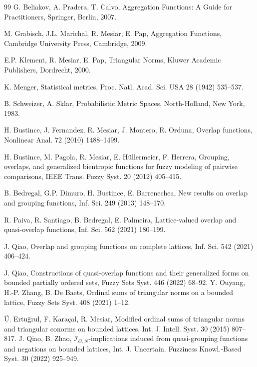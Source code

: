 \documentclass[preprint,12pt]{elsarticle}
\begin{document}
\begin{thebibliography}{99}
G. Beliakov, A. Pradera, T. Calvo, Aggregation Functions: A Guide for Practitioners, Springer, Berlin, 2007.

M. Grabisch, J.L. Marichal, R. Mesiar, E. Pap, Aggregation Functions, Cambridge University Press, Cambridge, 2009.

E.P. Klement, R. Mesiar, E. Pap, Triangular Norms, Kluwer Academic Publishers, Dordrecht, 2000.

K. Menger, Statistical metrics, Proc. Natl. Acad. Sci. USA 28 (1942) 535--537.

B. Schweizer, A. Sklar, Probabilistic Metric Spaces, North-Holland, New York, 1983.

H. Bustince, J. Fernandez, R. Mesiar, J. Montero, R. Orduna, Overlap functions, Nonlinear Anal. 72 (2010) 1488--1499.

H. Bustince, M. Pagola, R. Mesiar, E. Hüllermeier, F. Herrera, Grouping, overlaps, and generalized bientropic functions for fuzzy modeling of pairwise comparisons, IEEE Trans. Fuzzy Syst. 20 (2012) 405--415.

B. Bedregal, G.P. Dimuro, H. Bustince, E. Barrenechea, New results on overlap and grouping functions, Inf. Sci. 249 (2013) 148--170.

R. Paiva, R. Santiago, B. Bedregal, E. Palmeira, Lattice-valued overlap and quasi-overlap functions, Inf. Sci. 562 (2021) 180--199.

J. Qiao, Overlap and grouping functions on complete lattices, Inf. Sci. 542 (2021) 406--424.

J. Qiao, Constructions of quasi-overlap functions and their generalized forms on bounded partially ordered sets, Fuzzy Sets Syst. 446 (2022) 68--92.
Y. Ouyang, H.-P. Zhang, B. De Baets, Ordinal sums of triangular norms on a bounded lattice, Fuzzy Sets Syst. 408 (2021) 1--12.

Ü. Ertuğrul, F. Karaçal, R. Mesiar, Modified ordinal sums of triangular norms and triangular conorms on bounded lattices, Int. J. Intell. Syst. 30 (2015) 807--817.
J. Qiao, B. Zhao, $\mathcal{I}_{G,N}$-implications induced from quasi-grouping functions and negations on bounded lattices, Int. J. Uncertain. Fuzziness Knowl.-Based Syst. 30 (2022) 925--949.


\end{thebibliography}
\end{document}
